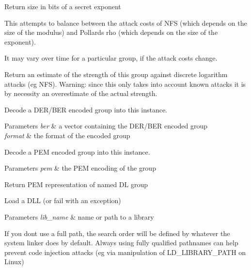 Return size in bits of a secret exponent

This attempts to balance between the attack costs of N\+FS (which depends on the size of the modulus) and Pollard\textquotesingle{}s rho (which depends on the size of the exponent).

It may vary over time for a particular group, if the attack costs change.

Return an estimate of the strength of this group against discrete logarithm attacks (eg N\+FS). Warning\+: since this only takes into account known attacks it is by necessity an overestimate of the actual strength.

Decode a D\+E\+R/\+B\+ER encoded group into this instance. 
\begin{DoxyParams}{Parameters}
{\em ber} & a vector containing the D\+E\+R/\+B\+ER encoded group \\
\hline
{\em format} & the format of the encoded group\\
\hline
\end{DoxyParams}
Decode a P\+EM encoded group into this instance. 
\begin{DoxyParams}{Parameters}
{\em pem} & the P\+EM encoding of the group\\
\hline
\end{DoxyParams}
Return P\+EM representation of named DL group

Load a D\+LL (or fail with an exception) 
\begin{DoxyParams}{Parameters}
{\em lib\+\_\+name} & name or path to a library\\
\hline
\end{DoxyParams}
If you don\textquotesingle{}t use a full path, the search order will be defined by whatever the system linker does by default. Always using fully qualified pathnames can help prevent code injection attacks (eg via manipulation of L\+D\+\_\+\+L\+I\+B\+R\+A\+R\+Y\+\_\+\+P\+A\+TH on Linux)

